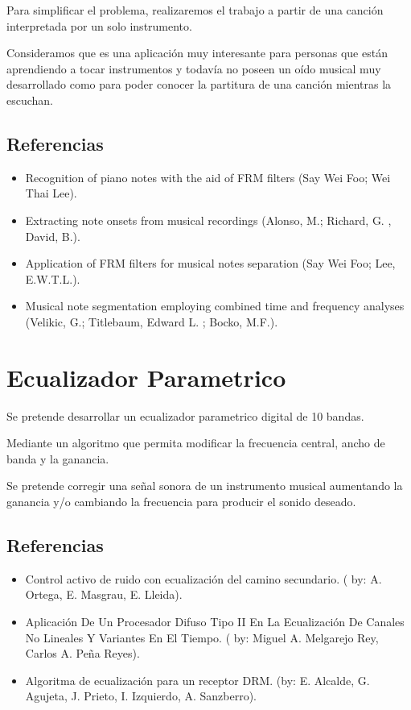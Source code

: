 \documentclass[a4paper,10pt]{article}
\begin{document}
	Para simplificar el problema, realizaremos el trabajo a partir
	de una canción interpretada por un solo instrumento.

	Consideramos que es una aplicación muy interesante para personas
	que están aprendiendo a tocar instrumentos y todavía no poseen
	un oído musical muy desarrollado como para poder conocer la
	partitura de una canción mientras la escuchan.

	\subsection*{Referencias}
		\begin{itemize}
			\item Recognition of piano notes with the aid
			of FRM filters (Say Wei Foo; Wei Thai Lee).
			\item Extracting note onsets from musical
			recordings (Alonso, M.; Richard, G. , David, B.).
			\item Application of FRM filters for musical
			notes separation (Say Wei Foo; Lee, E.W.T.L.).
			\item Musical note segmentation employing
			combined time and frequency analyses (Velikic,
			G.; Titlebaum, Edward L. ; Bocko, M.F.).
		\end{itemize}

	\clearpage

\section*{Ecualizador Parametrico}
Se pretende desarrollar un ecualizador parametrico digital de 10 bandas.

 Mediante un algoritmo que permita modificar la frecuencia central, ancho
de banda y la ganancia.

Se pretende corregir una señal sonora de un instrumento musical
aumentando la  ganancia y/o cambiando la frecuencia para producir el
sonido deseado.

	\subsection*{Referencias}
		\begin{itemize}
			\item Control activo de ruido con ecualización
			del camino secundario. ( by: A. Ortega,
			E. Masgrau, E. Lleida).
			\item Aplicación De Un Procesador Difuso Tipo
			II En La Ecualización De Canales No Lineales
			Y Variantes En El Tiempo. ( by: Miguel A.
			Melgarejo Rey, Carlos A. Peña Reyes).
			\item Algoritma de ecualización para un receptor
			DRM. (by: E. Alcalde, G.  Agujeta, J. Prieto,
			I. Izquierdo, A. Sanzberro).
		\end{itemize}
\end{document}
